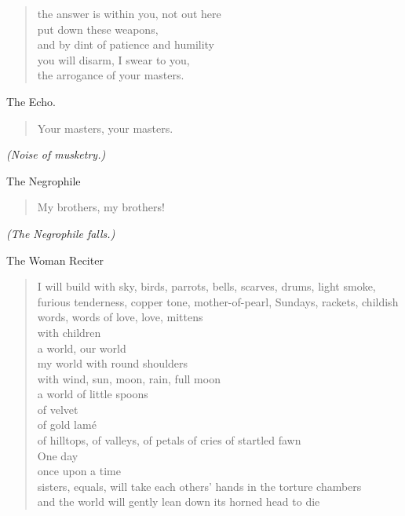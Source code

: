 \documentclass[letterpaper,article,12pt,oneside,notitlepage]{memoir}
\begin{document}
\begin{verse}
the answer is within you, not out here \\
put down these weapons, \\
and by dint of patience and humility \\
you will disarm, I swear to you, \\
the arrogance of your masters. \\
\end{verse}

\begin{center}The Echo.\end{center}

\begin{verse}
Your masters, your masters. \\
\end{verse}

\textit{(Noise of musketry.)}

\begin{center}The Negrophile \end{center}

\begin{verse}
My brothers, my brothers! \\
\end{verse}

\textit{(The Negrophile falls.)}

\begin{center}The Woman Reciter\end{center}

\begin{verse}
I will build with sky, birds, parrots, bells, scarves, drums, light smoke, furious tenderness, copper tone, mother-of-pearl, Sundays, rackets, childish words, words of love, love, mittens  \\
with children \\
a world, our world \\
my world with round shoulders \\
with wind, sun, moon, rain, full moon \\
a world of little spoons \\
of velvet \\
of gold lamé \\
of hilltops, of valleys, of petals of cries of startled fawn \\
One day \\
once upon a time \\
sisters, equals, will take each others' hands in the torture chambers \\
and the world will gently lean down its horned head to die \\
\end{verse}
\end{document}
